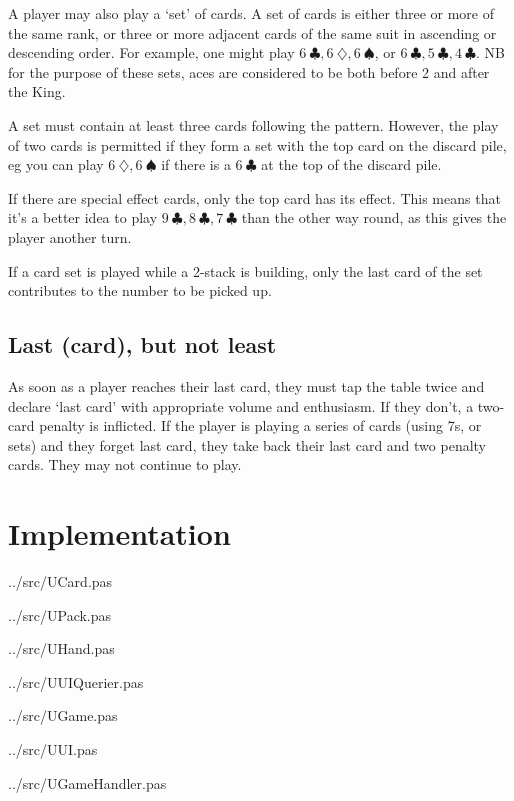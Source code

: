 \documentclass{article}
\begin{document}
    A player may also play a `set' of cards. A set of cards is either three or
    more of the same rank, or three or more adjacent cards of the same suit in
    ascending or descending order. For example, one might play
    $6\ \clubsuit, 6\ \diamondsuit, 6\ \spadesuit$, or
    $6\ \clubsuit, 5\ \clubsuit, 4\ \clubsuit$. NB for the purpose of these
    sets, aces are considered to be both before 2 and after the King.

    A set must contain at least three cards following the pattern. However, the
    play of two cards is permitted if they form a set with the top card on the
    discard pile, eg you can play $6\ \diamondsuit, 6\ \spadesuit$ if there is a 
    $6\ \clubsuit$ at the top of the discard pile.

    If there are special effect cards, only the top card has its effect. This
    means that it's a better idea to play
    $9\ \clubsuit, 8\ \clubsuit, 7\ \clubsuit$
    than the other way round, as this gives the player another turn.

    If a card set is played while a 2-stack is building, only the last card of
    the set contributes to the number to be picked up.

    \subsection{Last (card), but not least}

    As soon as a player reaches their last card, they must tap the table twice
    and declare `last card' with appropriate volume and enthusiasm. If they
    don't, a two-card penalty is inflicted. If the player is playing a series
    of cards (using 7s, or sets) and they forget last card, they take back
    their last card and two penalty cards. They may not continue to play.

    \section{Implementation}


{../src/UCard.pas}

{../src/UPack.pas}

{../src/UHand.pas}

{../src/UUIQuerier.pas}

{../src/UGame.pas}

{../src/UUI.pas}

{../src/UGameHandler.pas}
\end{document}
